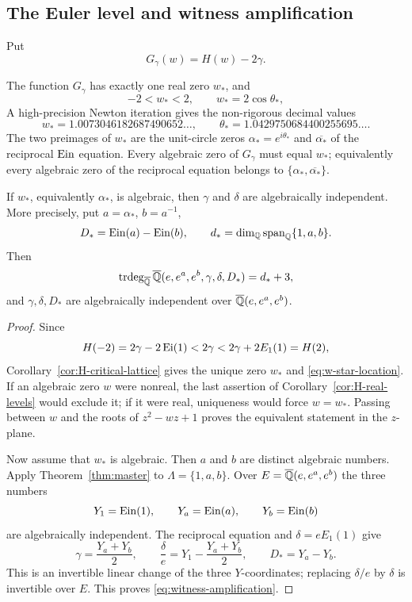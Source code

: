 \subsection{The Euler level and witness amplification}

Put
\[
 G_\gamma(w)=H(w)-2\gamma.
\]

\begin{theorem}
\label{thm:H-euler-level}
The function $G_\gamma$ has exactly one real zero $w_*$, and
\begin{equation}\label{eq:w-star-location}
 -2<w_*<2,\qquad w_*=2\cos\theta_*,
\end{equation}
A high-precision Newton iteration gives the non-rigorous decimal values
\[
 w_*=1.0073046182687490652\ldots,
 \qquad \theta_*=1.0429750684400255695\ldots.
\]
The two preimages of $w_*$ are the unit-circle zeros
$\alpha_*=e^{i\theta_*}$ and $\overline{\alpha_*}$ of the reciprocal
$\operatorname{Ein}$ equation.  Every algebraic zero of $G_\gamma$ must equal $w_*$;
equivalently every algebraic zero of the reciprocal equation belongs to
$\{\alpha_*,\overline{\alpha_*}\}$.

If $w_*$, equivalently $\alpha_*$, is algebraic, then $\gamma$ and
$\delta$ are algebraically independent.  More precisely, put
$a=\alpha_*$, $b=a^{-1}$,
\[
 D_*=\operatorname{Ein}(a)-\operatorname{Ein}(b),\qquad
 d_*=\dim_{\mathbb Q}\operatorname{span}_{\mathbb Q}\{1,a,b\}.
\]
Then
\begin{equation}\label{eq:witness-amplification}
 \operatorname{trdeg}_{\overline{\mathbb Q}}
 \overline{\mathbb Q}(e,e^a,e^b,\gamma,\delta,D_*)=d_*+3,
\end{equation}
and $\gamma,\delta,D_*$ are algebraically independent over
$\overline{\mathbb Q}(e,e^a,e^b)$.
\end{theorem}

\begin{proof}
Since
\[
 H(-2)=2\gamma-2\operatorname{Ei}(1)<2\gamma
 <2\gamma+2E_1(1)=H(2),
\]
Corollary~\ref{cor:H-critical-lattice} gives the unique zero $w_*$ and
\eqref{eq:w-star-location}.  If an algebraic zero $w$ were nonreal, the
last assertion of Corollary~\ref{cor:H-real-levels} would exclude it; if it
were real, uniqueness would force $w=w_*$.  Passing between $w$ and the
roots of $z^2-wz+1$ proves the equivalent statement in the $z$-plane.

Now assume that $w_*$ is algebraic.  Then $a$ and $b$ are distinct
algebraic numbers.  Apply Theorem~\ref{thm:master} to
$\Lambda=\{1,a,b\}$.  Over
$E=\overline{\mathbb Q}(e,e^a,e^b)$ the three numbers
\[
 Y_1=\operatorname{Ein}(1),\qquad Y_a=\operatorname{Ein}(a),\qquad Y_b=\operatorname{Ein}(b)
\]
are algebraically independent.  The reciprocal equation and
$\delta=eE_1(1)$ give
\[
 \gamma=\frac{Y_a+Y_b}{2},\qquad
 \frac{\delta}{e}=Y_1-\frac{Y_a+Y_b}{2},\qquad
 D_*=Y_a-Y_b.
\]
This is an invertible linear change of the three $Y$-coordinates; replacing
$\delta/e$ by $\delta$ is invertible over $E$.  This proves
\eqref{eq:witness-amplification}.
\end{proof}

